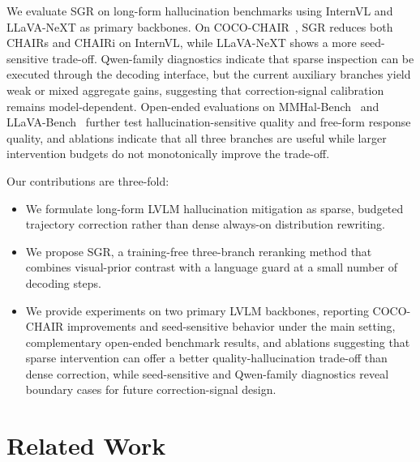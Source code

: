 \documentclass[11pt]{article}
\begin{document}
  We evaluate SGR on long-form hallucination benchmarks using InternVL and LLaVA-NeXT as primary backbones.
  On COCO-CHAIR~\citep{rohrbach-etal-2018-object,DBLP:conf/eccv/LinMBHPRDZ14}, SGR reduces both CHAIRs and CHAIRi on InternVL, while LLaVA-NeXT shows a more seed-sensitive trade-off.
  Qwen-family diagnostics indicate that sparse inspection can be executed through the decoding interface, but the current auxiliary branches yield weak or mixed aggregate gains, suggesting that correction-signal calibration remains model-dependent.
  Open-ended evaluations on MMHal-Bench~\citep{sun-etal-2024-aligning} and LLaVA-Bench~\citep{liu-etal-2023-visual-instruction} further test hallucination-sensitive quality and free-form response quality, and ablations indicate that all three branches are useful while larger intervention budgets do not monotonically improve the trade-off.

  Our contributions are three-fold:
  \begin{itemize}
    \item We formulate long-form LVLM hallucination mitigation as sparse, budgeted trajectory correction rather than dense always-on distribution rewriting.
    \item We propose SGR, a training-free three-branch reranking method that combines visual-prior contrast with a language guard at a small number of decoding steps.
    \item We provide experiments on two primary LVLM backbones, reporting COCO-CHAIR improvements and seed-sensitive behavior under the main setting, complementary open-ended benchmark results, and ablations suggesting
  that sparse intervention can offer a better quality-hallucination trade-off than dense correction, while seed-sensitive and Qwen-family diagnostics reveal boundary cases for future correction-signal design.
  \end{itemize}

\section{Related Work}
\end{document}
